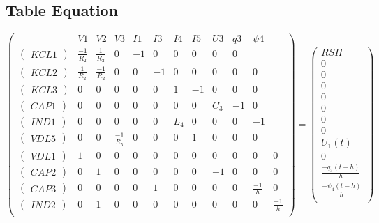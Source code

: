 \documentclass[10pt]{article}
\begin{document}
\subsection{Table Equation}
\[\left(\begin{array}{cccccccccccc}
  &V1&V2&V3&I1&I3&I4&I5&U3&q3&\psi 4\\
  \hline
  \left(\begin{array}{c} KCL1 \end{array}\right)&\frac{-1}{R_{2}}&\frac{1}{R_{2}}&0&-1&0&0&0&0&0\\
  \left(\begin{array}{c} KCL2 \end{array}\right)&\frac{1}{R_{2}}&\frac{-1}{R_{2}}&0&0&-1&0&0&0&0&0\\
  \left(\begin{array}{c} KCL3 \end{array}\right)&0&0&0&0&0&1&-1&0&0&0\\
  \left(\begin{array}{c} CAP1 \end{array}\right)&0&0&0&0&0&0&0&C_{3}&-1&0\\
  \left(\begin{array}{c} IND1 \end{array}\right)&0&0&0&0&0&L_{4}&0&0&0&-1\\
  \left(\begin{array}{c} VDL5 \end{array}\right)&0&0&\frac{-1}{R_{5}}&0&0&0&1&0&0&0\\
  \left(\begin{array}{c} VDL1 \end{array}\right)&1&0&0&0&0&0&0&0&0&0&0\\
  \left(\begin{array}{c} CAP2 \end{array}\right)&0&1&0&0&0&0&0&-1&0&0&0\\
  \left(\begin{array}{c} CAP3 \end{array}\right)&0&0&0&0&1&0&0&0&0&\frac{-1}{h}&0\\
  \left(\begin{array}{c} IND2 \end{array}\right)&0&1&0&0&0&0&0&0&0&0&\frac{-1}{h}\\
\end{array}\right) =
\left(\begin{array}{c}
  RSH\\
  \hline
  0\\
  0\\
  0\\
  0\\
  0\\
  0\\
  0\\
  U_{1}(t)\\
  0\\
  \frac{-q_{3}(t-h)}{h}\\
  \frac{-\psi_{4}(t-h)}{h}\\
\end{array}\right)\]
\end{document}
